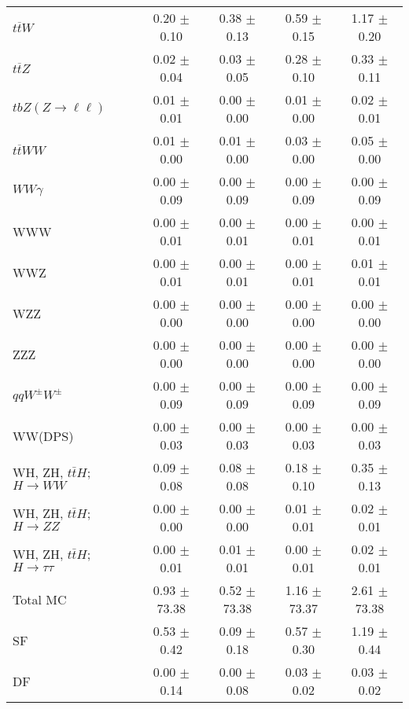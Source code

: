 \begin{tabular}{l|cccc}
                   $t\overline{t}W$ &  0.20 $\pm$  0.10 &  0.38 $\pm$  0.13 &  0.59 $\pm$  0.15 &  1.17 $\pm$  0.20 \\
                   $t\overline{t}Z$ &  0.02 $\pm$  0.04 &  0.03 $\pm$  0.05 &  0.28 $\pm$  0.10 &  0.33 $\pm$  0.11 \\
    $tbZ (Z \rightarrow \ell \ell)$ &  0.01 $\pm$  0.01 &  0.00 $\pm$  0.00 &  0.01 $\pm$  0.00 &  0.02 $\pm$  0.01 \\
                  $t\overline{t}WW$ &  0.01 $\pm$  0.00 &  0.01 $\pm$  0.00 &  0.03 $\pm$  0.00 &  0.05 $\pm$  0.00 \\
                         $WW\gamma$ &  0.00 $\pm$  0.09 &  0.00 $\pm$  0.09 &  0.00 $\pm$  0.09 &  0.00 $\pm$  0.09 \\
                                WWW &  0.00 $\pm$  0.01 &  0.00 $\pm$  0.01 &  0.00 $\pm$  0.01 &  0.00 $\pm$  0.01 \\
                                WWZ &  0.00 $\pm$  0.01 &  0.00 $\pm$  0.01 &  0.00 $\pm$  0.01 &  0.01 $\pm$  0.01 \\
                                WZZ &  0.00 $\pm$  0.00 &  0.00 $\pm$  0.00 &  0.00 $\pm$  0.00 &  0.00 $\pm$  0.00 \\
                                ZZZ &  0.00 $\pm$  0.00 &  0.00 $\pm$  0.00 &  0.00 $\pm$  0.00 &  0.00 $\pm$  0.00 \\
                 $qqW^{\pm}W^{\pm}$ &  0.00 $\pm$  0.09 &  0.00 $\pm$  0.09 &  0.00 $\pm$  0.09 &  0.00 $\pm$  0.09 \\
                            WW(DPS) &  0.00 $\pm$  0.03 &  0.00 $\pm$  0.03 &  0.00 $\pm$  0.03 &  0.00 $\pm$  0.03 \\
WH, ZH, $t\bar{t}H$; $H \rightarrow WW$ &  0.09 $\pm$  0.08 &  0.08 $\pm$  0.08 &  0.18 $\pm$  0.10 &  0.35 $\pm$  0.13 \\
WH, ZH, $t\bar{t}H$; $H \rightarrow ZZ$ &  0.00 $\pm$  0.00 &  0.00 $\pm$  0.00 &  0.01 $\pm$  0.01 &  0.02 $\pm$  0.01 \\
WH, ZH, $t\bar{t}H$; $H \rightarrow \tau\tau$ &  0.00 $\pm$  0.01 &  0.01 $\pm$  0.01 &  0.00 $\pm$  0.01 &  0.02 $\pm$  0.01 \\
\hline\hline
                           Total MC &  0.93 $\pm$ 73.38 &  0.52 $\pm$ 73.38 &  1.16 $\pm$ 73.37 &  2.61 $\pm$ 73.38 \\
\hline
                                 SF &  0.53 $\pm$  0.42 &  0.09 $\pm$  0.18 &  0.57 $\pm$  0.30 &  1.19 $\pm$  0.44 \\
                                 DF &  0.00 $\pm$  0.14 &  0.00 $\pm$  0.08 &  0.03 $\pm$  0.02 &  0.03 $\pm$  0.02 \\

\end{tabular}
